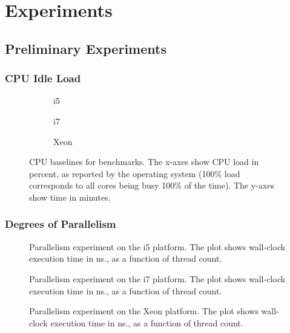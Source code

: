 \chapter{Experiments}
\label{sec:experiments}

\section{Preliminary Experiments}

\subsection{CPU Idle Load}
\begin{figure}[hbpt]
	\graphicspath{{plots/}}
	\begin{subfigure}{1\textwidth}
		
		\caption{i5}
	\end{subfigure}
	\begin{subfigure}{1\textwidth}
		
		\caption{i7}
	\end{subfigure}
	\begin{subfigure}{1\textwidth}
		
		\caption{Xeon}
	\end{subfigure}
	\caption{CPU baselines for benchmarks. The x-axes show CPU load in
	percent, as reported by the operating system (100\% load corresponds to
	all cores being busy 100\% of the time). The y-axes show time in minutes.}
	\label{fig:cpuload}
\end{figure}

\subsection{Degrees of Parallelism}

\begin{figure}[hbpt]
\graphicspath{{plots/}}

	\caption{Parallelism experiment on the i5 platform. The plot shows
	wall-clock execution time in ns., as a function of thread count.}
	\label{fig:parallel-i5}
\end{figure}

\begin{figure}[hbpt]
\graphicspath{{plots/}}

	\caption{Parallelism experiment on the i7 platform. The plot shows
	wall-clock execution time in ns., as a function of thread count.}
	\label{fig:parallel-i7}
\end{figure}

\begin{figure}[hbpt]
\graphicspath{{plots/}}

	\caption{Parallelism experiment on the Xeon platform. The plot shows
	wall-clock execution time in ns., as a function of thread count.}
	\label{fig:parallel-xeon}
\end{figure}


